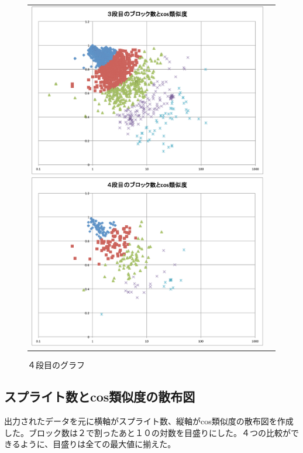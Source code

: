 \documentclass[a4paper,10pt,onecolumn,oneside,openany]{jsbook}
\begin{document}
\begin{figure}[h]
\begin{tabular}{cc}
\begin{minipage}[t]{0.45\hsize}
	 \centering
	 \includegraphics[keepaspectratio, scale = 0.25]{graph_3_block.pdf}
	 \caption{３段目のグラフ}
	 \label{third_block}
	\end{minipage}
        \begin{minipage}[t]{0.45\hsize}
	 \centering
	 \includegraphics[keepaspectratio, scale = 0.25]{graph_4_block.pdf}
	 \caption{４段目のグラフ}
	 \label{fourth_block}
	\end{minipage}
 \end{tabular}
 \end{figure}

\newpage
\subsection{スプライト数とcos類似度の散布図}
 出力されたデータを元に横軸がスプライト数、縦軸がcos類似度の散布図を作成した。ブロック数は２で割ったあと１０の対数を目盛りにした。４つの比較ができるように、目盛りは全ての最大値に揃えた。
\end{document}
